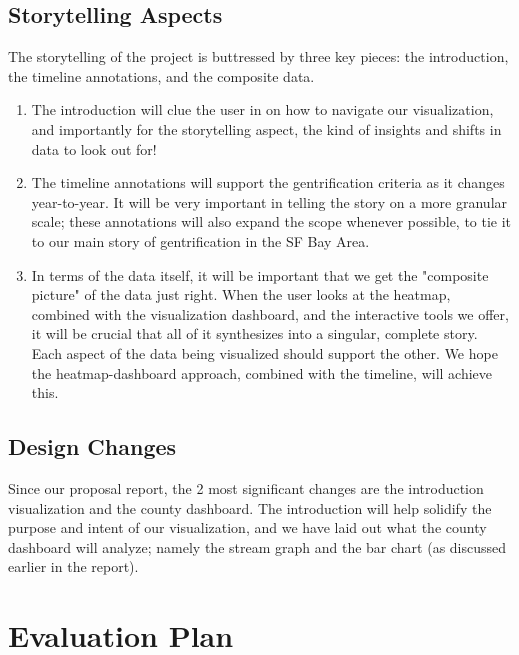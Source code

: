 \documentclass{article}
\begin{document}
\subsection{Storytelling Aspects}

The storytelling of the project is buttressed by three key pieces: the introduction, the timeline annotations, and the composite data.

\begin{enumerate}

    \item The introduction will clue the user in on how to navigate our visualization, and importantly for the storytelling aspect, the kind of insights and shifts in data to look out for!
    
    \item The timeline annotations will support the gentrification criteria as it changes year-to-year. It will be very important in telling the story on a more granular scale; these annotations will also expand the scope whenever possible, to tie it to our main story of gentrification in the SF Bay Area.
    
    \item In terms of the data itself, it will be important that we get the "composite picture" of the data just right. When the user looks at the heatmap, combined with the visualization dashboard, and the interactive tools we offer, it will be crucial that all of it synthesizes into a singular, complete story. Each aspect of the data being visualized should support the other. We hope the heatmap-dashboard approach, combined with the timeline, will achieve this.
    
\end{enumerate}

\subsection{Design Changes}

Since our proposal report, the 2 most significant changes are the introduction visualization and the county dashboard. The introduction will help solidify the purpose and intent of our visualization, and we have laid out what the county dashboard will analyze; namely the stream graph and the bar chart (as discussed earlier in the report).

\section{Evaluation Plan}
\end{document}
